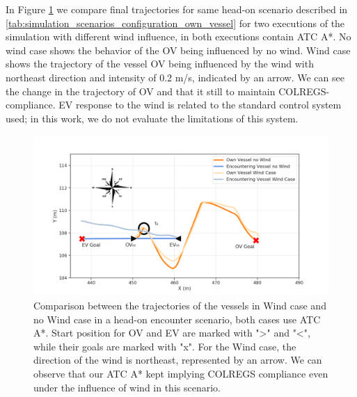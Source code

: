         In Figure \ref{fig:plot_ho_w_vs_wind} we compare final trajectories for same head-on scenario described in \ref{tab:simulation_scenarios_configuration_own_vessel} for two executions of the simulation with different wind influence, in both executions contain \ac{ATC} A*. No wind case shows the behavior of the \ac{OV} being influenced by no wind. Wind case shows the trajectory of the vessel \ac{OV} being influenced by the wind with northeast direction and intensity of 0.2 m/s, indicated by an arrow. We can see the change in the trajectory of \ac{OV} and that it still to maintain COLREGS-compliance. \ac{EV} response to the wind is related to the standard control system used; in this work, we do not evaluate the limitations of this system.
        \begin{figure}[H]
            \centering
            \includegraphics[width=\textwidth]{figs/Chap5/plot_ho_w_vs_wind.png}
            \caption{Comparison between the trajectories of the vessels in Wind case and no Wind case in a head-on encounter scenario, both cases use \ac{ATC} A*. Start position for \ac{OV} and \ac{EV} are marked with ">" and "<", while their goals are marked with "x". For the Wind case, the direction of the wind is northeast, represented by an arrow. We can observe that our \ac{ATC} A* kept implying COLREGS compliance even under the influence of wind in this scenario.}
            \label{fig:plot_ho_w_vs_wind}
        \end{figure}
        
